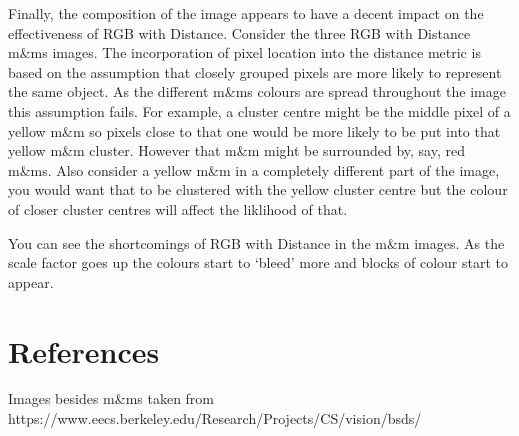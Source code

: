 \documentclass{article}
\begin{document}
Finally, the composition of the image appears to have a decent impact on the effectiveness of RGB with Distance. Consider the three RGB with Distance m\&ms images. The incorporation of pixel location into the distance metric is based on the assumption that closely grouped pixels are more likely to represent the same object. As the different m\&ms colours are spread throughout the image this assumption fails. For example, a cluster centre might be the middle pixel of a yellow m\&m so pixels close to that one would be more likely to be put into that yellow m\&m cluster. However that m\&m might be surrounded by, say, red m\&ms. Also consider a yellow m\&m in a completely different part of the image, you would want that to be clustered with the yellow cluster centre but the colour of closer cluster centres will affect the liklihood of that. 

You can see the shortcomings of RGB with Distance in the m\&m images. As the scale factor goes up the colours start to `bleed' more and blocks of colour start to appear.   

\section{References}

Images besides m\&ms taken from https://www.eecs.berkeley.edu/Research/Projects/CS/vision/bsds/
\end{document}
